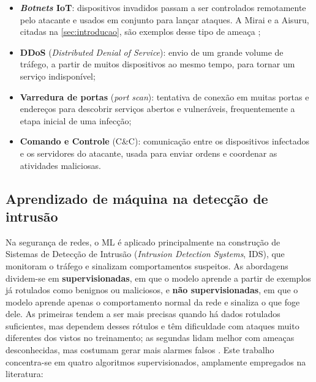 \documentclass[alpha-refs,brazilian]{CC-EC_TF-TC}
\begin{document}
\begin{itemize}
    \item \textbf{\textit{Botnets} IoT}: dispositivos invadidos passam a ser controlados remotamente pelo atacante e usados em conjunto para lançar ataques. A Mirai e a Aisuru, citadas na \autoref{sec:introducao}, são exemplos desse tipo de ameaça \citep{kolias2017ddos,cloudflare2025aisuru};
    \item \textbf{DDoS} (\textit{Distributed Denial of Service}): envio de um grande volume de tráfego, a partir de muitos dispositivos ao mesmo tempo, para tornar um serviço indisponível;
    \item \textbf{Varredura de portas} (\textit{port scan}): tentativa de conexão em muitas portas e endereços para descobrir serviços abertos e vulneráveis, frequentemente a etapa inicial de uma infecção;
    \item \textbf{Comando e Controle} (C\&C): comunicação entre os dispositivos infectados e os servidores do atacante, usada para enviar ordens e coordenar as atividades maliciosas.
\end{itemize}

\subsection{Aprendizado de máquina na detecção de intrusão}

Na segurança de redes, o ML é aplicado principalmente na construção de Sistemas de Detecção de Intrusão (\textit{Intrusion Detection Systems}, IDS), que monitoram o tráfego e sinalizam comportamentos suspeitos. As abordagens dividem-se em \textbf{supervisionadas}, em que o modelo aprende a partir de exemplos já rotulados como benignos ou maliciosos, e \textbf{não supervisionadas}, em que o modelo aprende apenas o comportamento normal da rede e sinaliza o que foge dele. As primeiras tendem a ser mais precisas quando há dados rotulados suficientes, mas dependem desses rótulos e têm dificuldade com ataques muito diferentes dos vistos no treinamento; as segundas lidam melhor com ameaças desconhecidas, mas costumam gerar mais alarmes falsos \citep{rahman2025survey}. Este trabalho concentra-se em quatro algoritmos supervisionados, amplamente empregados na literatura:
\end{document}
